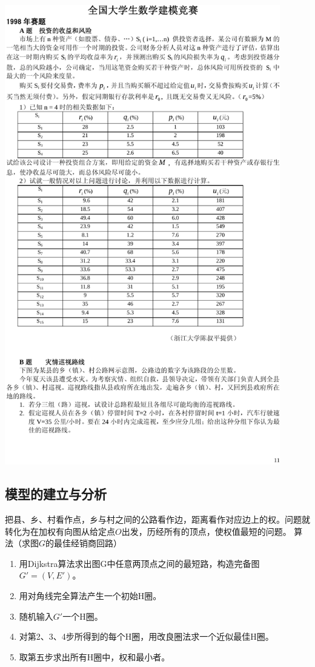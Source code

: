 \includegraphics[width=0.9\textwidth,page=2]{Figures/1998}

\subsection{模型的建立与分析}
把县、乡、村看作点，乡与村之间的公路看作边，距离看作对应边上的权。问题就转化为在加权有向图从给定点$O$出发，历经所有的顶点，使权值最短的问题。
算法（求图$G$的最佳经销商回路）
\begin{enumerate}
\item 用Dijkstra算法求出图G中任意两顶点之间的最短路，构造完备图$G'=(V,E')$。
\item 用对角线完全算法产生一个初始H圈。
\item 随机输入$G'$一个H圈。
\item 对第2、3、4步所得到的每个H圈，用改良圈法求一个近似最佳H圈。
\item 取第五步求出所有H圈中，权和最小者。
\end{enumerate}
